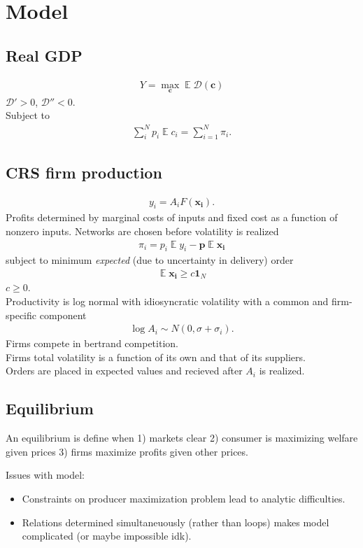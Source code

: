 \documentclass{article}
\DeclareMathOperator{\E}{\mathbb{E}}
\begin{document}
\section{Model}
\subsection{Real GDP}
\begin{align*}
    Y = \max_{\mathbf{c}} \E \mathcal{D}(\mathbf{c})
\end{align*}
$\mathcal{D}'>0$, $\mathcal{D}''<0$.\\
Subject to
\begin{align*}
    \sum_i^N p_i \E c_i = \sum_{i=1}^N \pi_i.
\end{align*}
\subsection{CRS firm production}
\begin{align*}
    y_i = A_i F(\mathbf{x_{i}}).
\end{align*}
Profits determined by marginal costs of inputs and fixed cost as a function of nonzero inputs. Networks are chosen before volatility is realized
\begin{align*}
    \pi_i = p_i \E y_i - \mathbf{p} \E \mathbf{x_{i}}
\end{align*}
subject to minimum \textit{expected} (due to uncertainty in delivery) order
\begin{align*}
    \E \mathbf{x_{i}} \geq c \mathbf{1}_N
\end{align*}
$c\geq 0$.\\
Productivity is log normal with idiosyncratic volatility with a common and firm-specific component
\begin{align*}
    \log A_i \sim N(0,\sigma + \sigma_i).
\end{align*}
Firms compete in bertrand competition.\\
Firms total volatility is a function of its own and that of its suppliers.\\
Orders are placed in expected values and recieved after $A_i$ is realized.
\subsection{Equilibrium}
An equilibrium is define when 1) markets clear 2) consumer is maximizing welfare given prices 3) firms maximize profits given other prices.

Issues with model:
\begin{itemize}
    \item Constraints on producer maximization problem lead to analytic difficulties.
    \item Relations determined simultaneuously (rather than loops) makes model complicated (or maybe impossible idk).
\end{itemize}
\end{document}
